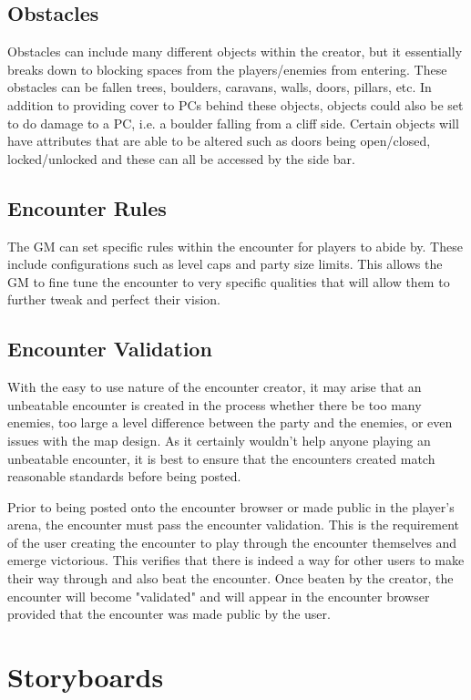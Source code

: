 \documentclass[12pt,a4paper]{report}
\begin{document}
		\subsection{Obstacles}
		Obstacles can include many different objects within the creator, but it essentially breaks down to blocking spaces from the players/enemies from entering. These obstacles can be fallen trees, boulders, caravans, walls, doors, pillars, etc. In addition to providing cover to PCs behind these objects, objects could also be set to do damage to a PC, i.e. a boulder falling from a cliff side. Certain objects will have attributes that are able to be altered such as doors being open/closed, locked/unlocked and these can all be accessed by the side bar.
		\subsection{Encounter Rules}
		The GM can set specific rules within the encounter for players to abide by. These include configurations such as level caps and party size limits. This allows the GM to fine tune the encounter to very specific qualities that will allow them to further tweak and perfect their vision.
		\subsection{Encounter Validation}
		With the easy to use nature of the encounter creator, it may arise that an unbeatable encounter is created in the process whether there be too many enemies, too large a level difference between the party and the enemies, or even issues with the map design. As it certainly wouldn't help anyone playing an unbeatable encounter, it is best to ensure that the encounters created match reasonable standards before being posted. 
		
		Prior to being posted onto the encounter browser or made public in the player's arena, the encounter must pass the encounter validation. This is the requirement of the user creating the encounter to play through the encounter themselves and emerge victorious. This verifies that there is indeed a way for other users to make their way through and also beat the encounter. Once beaten by the creator, the encounter will become "validated" and will appear in the encounter browser provided that the encounter was made public by the user.
		
	\section{Storyboards}
\end{document}
